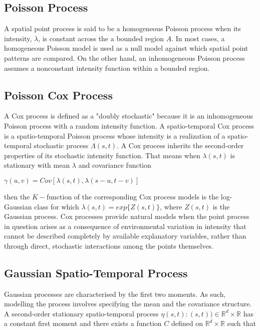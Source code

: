 \documentclass[a4paper]{thesis}
\begin{document}
\subsection{Poisson Process}

A spatial point process is said to be a homogeneous Poisson process when its intensity, $\lambda$, is constant across the a bounded region $A$. In most cases, a homogeneous Poisson model is used as a null model against which spatial point patterns are compared. On the other hand, an inhomogeneous Poisson process assumes a nonconstant intensity function within a bounded region.

\subsection{Poisson Cox Process}

A Cox process is defined as a "doubly stochastic"  because it is an inhomogeneous Poisson process with a random intensity function. A spatio-temporal Cox process is a spatio-temporal Poisson process whose intensity is a realization of a spatio-temporal stochastic process $\Lambda(s,t)$. A Cox process inherits the second-order properties of its stochastic intensity function. That means when $\lambda(s,t)$ is stationary with mean $\lambda$ and covariance function 

\begin{center}
$\gamma(u,v) = Cov [\lambda(s,t), \lambda(s-u,t-v)]$
\end{center}

then the $K-$function of the corresponding Cox process models is the log-Gaussian class for which $\lambda(s,t) = exp \lbrace Z(s,t)\rbrace$, where $Z(s,t)$ is the Gaussian process. Cox processes provide natural models
when the point process in question arises as a consequence of environmental variation in
intensity that cannot be described completely by available explanatory variables, rather
than through direct, stochastic interactions among the points themselves.

\subsection{Gaussian Spatio-Temporal Process}

Gaussian processes are characterised by the first two moments. As such, modelling the process involves specifying the mean and the covariance structure. A second-order stationary spatio-temporal process ${\eta(s,t):(s,t))\in \mathbb{R}^d \times \mathbb{R}}$ has a constant first moment and there exists a function $C$ defined on $\mathbb{R}^d \times \mathbb{R}$ such that 
\end{document}
